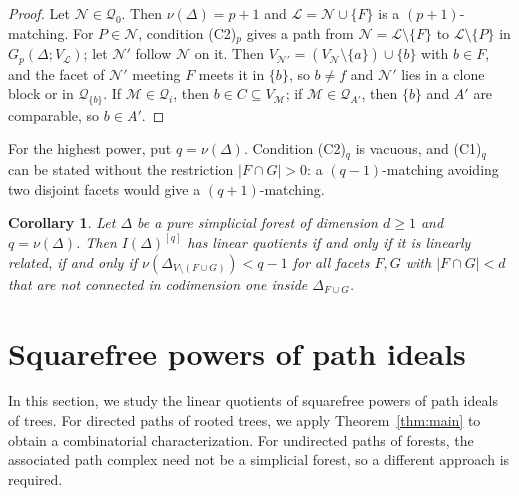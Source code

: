 \documentclass{amsart}
\newtheorem{Corollary}[Theorem]{Corollary}
\theoremstyle{definition}
\theoremstyle{remark}
\newtheorem{Remark}[Theorem]{Remark}
\begin{document}
\begin{proof}
Let $\mathcal N\in\mathcal Q_0$. Then $\nu(\Delta)=p+1$ and $\mathcal L=\mathcal N\cup\{F\}$ is a $(p+1)$-matching. For $P\in\mathcal N$, condition (C2)$_p$ gives a path from $\mathcal N=\mathcal L\setminus\{F\}$ to $\mathcal L\setminus\{P\}$ in $G_p(\Delta;V_{\mathcal L})$; let $\mathcal N'$ follow $\mathcal N$ on it. Then $V_{\mathcal N'}=(V_{\mathcal N}\setminus\{a\})\cup\{b\}$ with $b\in F$, and the facet of $\mathcal N'$ meeting $F$ meets it in $\{b\}$, so $b\neq f$ and $\mathcal N'$ lies in a clone block or in $\mathcal Q_{\{b\}}$. If $\mathcal M\in\mathcal Q_i$, then $b\in C\subseteq V_{\mathcal M}$; if $\mathcal M\in\mathcal Q_{A'}$, then $\{b\}$ and $A'$ are comparable, so $b\in A'$.
\end{proof}


For the highest power, put $q=\nu(\Delta)$. Condition (C2)$_q$ is vacuous, and (C1)$_q$ can be stated without the restriction $|F\cap G|>0$: a $(q-1)$-matching avoiding two disjoint facets would give a $(q+1)$-matching.


\begin{Corollary}\label{cor:top}
Let $\Delta$ be a pure simplicial forest of dimension $d\geq 1$ and $q=\nu(\Delta)$. Then $I(\Delta)^{[q]}$ has linear quotients if and only if it is linearly related, if and only if $\nu(\Delta_{V\setminus(F\cup G)})<q-1$ for all facets $F,G$ with $|F\cap G|<d$ that are not connected in codimension one inside $\Delta_{F\cup G}$.
\end{Corollary}



\section{Squarefree powers of path ideals}\label{sec:path-ideals}
In this section, we study the linear quotients of squarefree powers of path ideals of trees.
For directed paths of rooted trees, we apply
Theorem~\ref{thm:main} to obtain a combinatorial
characterization. For undirected paths of forests, the
associated path complex need not be a simplicial forest,
so a different approach is required.
\end{document}
